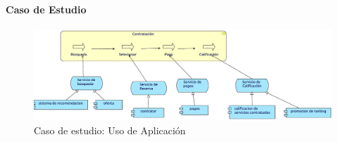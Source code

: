 \paragraph{Caso de Estudio}

\begin{figure}[h!]
	\centering
	\includegraphics[width=\linewidth]{Desarrollo/ArquitecturaEmpresarial/Aplicacion/imgs/usoMetamodelo.pdf}
	\caption{Caso de estudio: Uso de Aplicación}
\end{figure}